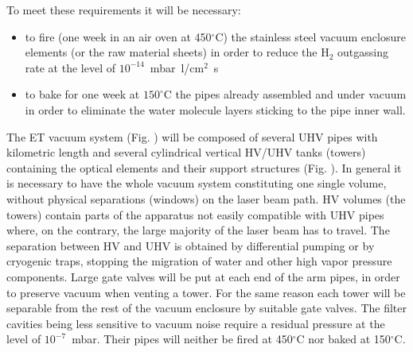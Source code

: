 To meet these requirements it will be necessary: 
\begin{itemize} 
\item to fire (one week in an air oven at 450$^\circ$C) the stainless steel vacuum enclosure elements (or the raw material sheets) in order to reduce the H$_2$ outgassing rate at the level of $10^{-14}$~mbar~l/cm$^{2}$~s 
\item to bake for one week at $150^\circ$C the pipes already assembled and under vacuum in order to eliminate the water molecule layers sticking to the pipe inner wall. 
\end{itemize} 


The ET vacuum system (Fig. )%
will be composed of several UHV pipes with kilometric length and several cylindrical vertical HV/UHV tanks (towers) containing the optical elements and their support structures (Fig. ).%
In general it is necessary to have the whole vacuum system constituting one single volume, without physical separations (windows) on the laser beam path. HV volumes (the towers) contain parts of the apparatus not easily compatible with UHV pipes where, on the contrary, the large majority of the laser beam has to travel. The separation between HV and UHV is obtained by differential pumping or by cryogenic traps, stopping the migration of water and other high vapor pressure components. Large gate valves will be put at each end of the arm pipes, in order to preserve vacuum when venting a tower. For the same reason each tower will be separable from the rest of the vacuum enclosure by suitable gate valves. The filter cavities being less sensitive to vacuum noise require a residual pressure at the level of $10^{-7}$~mbar. Their pipes will neither be fired at 450$^\circ$C nor baked at 150$^\circ$C. 


